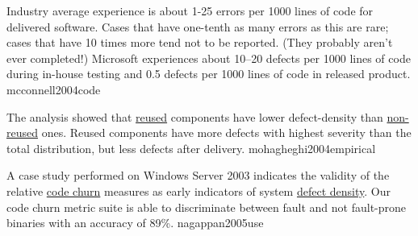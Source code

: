 \documentclass{article}
\begin{document}


  {Industry average experience is about 1-25 errors per 1000 lines of code for delivered software. Cases that have one-tenth as many errors as this are rare; cases that have 10 times more tend not to be reported. (They probably aren't ever completed!) Microsoft experiences about 10–20 defects per 1000 lines of code during in-house testing and 0.5 defects per 1000 lines of code in released product.}
  {mcconnell2004code}


  {The analysis showed that \ul{reused} components have lower defect-density than \ul{non-reused} ones. Reused components have more defects with highest severity than the total distribution, but less defects after delivery.}
  {mohagheghi2004empirical}

  {A case study performed on Windows Server 2003 indicates the validity of the relative \ul{code churn} measures as early indicators of system \ul{defect density}. Our code churn metric suite is able to discriminate between fault and not fault-prone binaries with an accuracy of 89\%.}
  {nagappan2005use}
\end{document}
